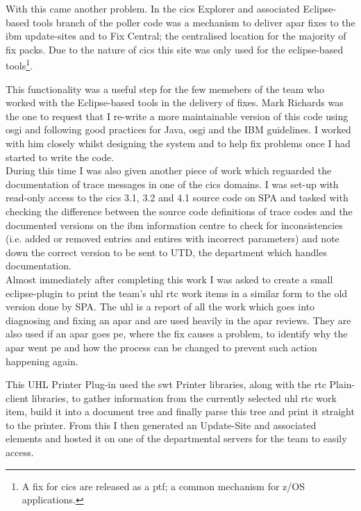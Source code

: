 \documentclass[a4paper,11pt]{report}
\begin{document}
With this came another problem. In the \gls{cics} Explorer and associated Eclipse-based tools 
branch of the poller code was a mechanism to deliver \gls{apar} fixes to the \gls{ibm} 
update-sites and to Fix Central; the centralised location for the majority of fix packs. Due to the
nature of \gls{cics} this site was only used for the eclipse-based tools\footnote{A fix for 
\gls{cics} are released as a \gls{ptf}; a common mechanism for z/OS applications.}.

This functionality was a useful step for the few memebers of the team who worked with the 
Eclipse-based tools in the delivery of fixes. Mark Richards was the one to request that I re-write
a more maintainable version of this code using \gls{osgi} and following good practices for Java,
\gls{osgi} and the IBM guidelines. I worked with him closely whilst designing the system and to 
help fix problems once I had started to write the code. \\



During this time I was also given another piece of work which reguarded the documentation of trace
messages in one of the \gls{cics} domains. I was set-up with read-only access to the \gls{cics} 
3.1, 3.2 and 4.1 source code on SPA and tasked with checking the difference between the source code
definitions of trace codes and the documented versions on the \gls{ibm} information centre to check
for inconsistencies (i.e. added or removed entries and entires with incorrect parameters) and note
down the correct version to be sent to UTD, the department which handles documentation. \\



Almost immediately after completing this work I was asked to create a small eclipse-plugin to print
the team's \gls{uhl} \gls{rtc} work items in a similar form to the old version done by SPA. The 
\gls{uhl} is a report of all the work which goes into diagnosing and fixing an \gls{apar} and are
used heavily in the \gls{apar} reviews. They are also used if an \gls{apar} goes \gls{pe}, where
the fix causes a problem, to identify why the \gls{apar} went \gls{pe} and how the process can be
changed to prevent such action happening again.

This UHL Printer Plug-in used the \gls{swt} Printer libraries, along with the \gls{rtc} 
Plain-client libraries, to gather information from the currently selected \gls{uhl} \gls{rtc} work
item, build it into a document tree and finally parse this tree and print it straight to the 
printer. From this I then generated an Update-Site and associated elements and hosted it on one of
the departmental servers for the team to easily access. \\
\end{document}
